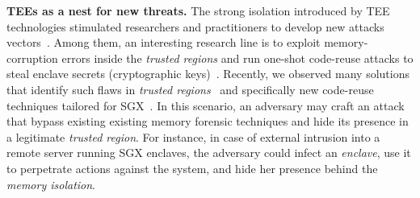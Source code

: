 \vspace{0.5cm}
\noindent \textbf{TEEs as a nest for new threats.}
%
%
The strong isolation introduced by TEE technologies stimulated researchers and 
practitioners to develop new attacks 
vectors~\citep{foreshadow,Murdock2019plundervolt,203183,lee2017hacking}.
Among them, an interesting research line is to exploit memory-corruption 
errors inside the \emph{trusted regions} and run one-shot code-reuse attacks to 
steal enclave secrets (\eg cryptographic keys)~\citep{geometry2007}.
Recently, we observed many solutions that identify such flaws in \emph{trusted 
regions}~\citep{teerex,tale-two-worlds} and specifically new code-reuse 
techniques tailored for SGX~\citep{lee2017hacking,biondo2018guard}.
In this scenario, an adversary may craft an attack that bypass existing 
existing memory forensic techniques and hide its presence in a legitimate 
\emph{trusted region}.
%
For instance, in case of external intrusion into a remote server running SGX 
enclaves, the adversary could infect an \emph{enclave}, use it to 
perpetrate actions against the system, and hide her presence behind the 
\emph{memory isolation}.

